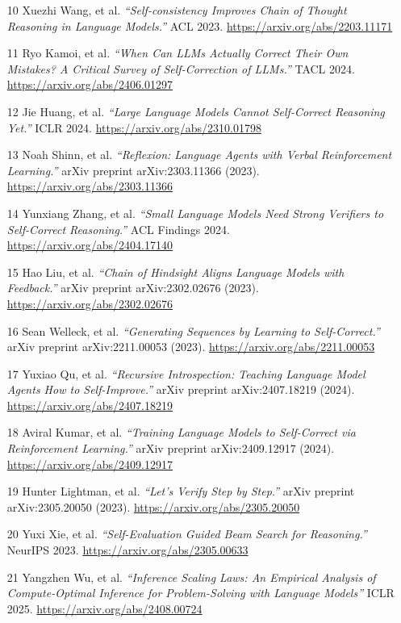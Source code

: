 \documentclass[12pt]{article}
\begin{document}
\begin{itemize}
    \item [10] Xuezhi Wang, et al. \textit{``Self-consistency Improves Chain of Thought Reasoning in Language Models.''} ACL 2023. \url{https://arxiv.org/abs/2203.11171}
    \item [11] Ryo Kamoi, et al. \textit{``When Can LLMs Actually Correct Their Own Mistakes? A Critical Survey of Self-Correction of LLMs.''} TACL 2024. \url{https://arxiv.org/abs/2406.01297}
    \item [12] Jie Huang, et al. \textit{``Large Language Models Cannot Self-Correct Reasoning Yet.''} ICLR 2024. \url{https://arxiv.org/abs/2310.01798}
    \item [13] Noah Shinn, et al. \textit{``Reflexion: Language Agents with Verbal Reinforcement Learning.''} arXiv preprint arXiv:2303.11366 (2023). \url{https://arxiv.org/abs/2303.11366}
    \item [14] Yunxiang Zhang, et al. \textit{``Small Language Models Need Strong Verifiers to Self-Correct Reasoning.''} ACL Findings 2024. \url{https://arxiv.org/abs/2404.17140}
    \item [15] Hao Liu, et al. \textit{``Chain of Hindsight Aligns Language Models with Feedback.''} arXiv preprint arXiv:2302.02676 (2023). \url{https://arxiv.org/abs/2302.02676}
    \item [16] Sean Welleck, et al. \textit{``Generating Sequences by Learning to Self-Correct.''} arXiv preprint arXiv:2211.00053 (2023). \url{https://arxiv.org/abs/2211.00053}
    \item [17] Yuxiao Qu, et al. \textit{``Recursive Introspection: Teaching Language Model Agents How to Self-Improve.''} arXiv preprint arXiv:2407.18219 (2024). \url{https://arxiv.org/abs/2407.18219}
    \item [18] Aviral Kumar, et al. \textit{``Training Language Models to Self-Correct via Reinforcement Learning.''} arXiv preprint arXiv:2409.12917 (2024). \url{https://arxiv.org/abs/2409.12917}
    \item [19] Hunter Lightman, et al. \textit{``Let’s Verify Step by Step.''} arXiv preprint arXiv:2305.20050 (2023). \url{https://arxiv.org/abs/2305.20050}
    \item [20] Yuxi Xie, et al. \textit{``Self-Evaluation Guided Beam Search for Reasoning.''} NeurIPS 2023. \url{https://arxiv.org/abs/2305.00633}
    \item [21] Yangzhen Wu, et al. \textit{``Inference Scaling Laws: An Empirical Analysis of Compute-Optimal Inference for Problem-Solving with Language Models''} ICLR 2025. \url{https://arxiv.org/abs/2408.00724}

\end{itemize}
\end{document}
